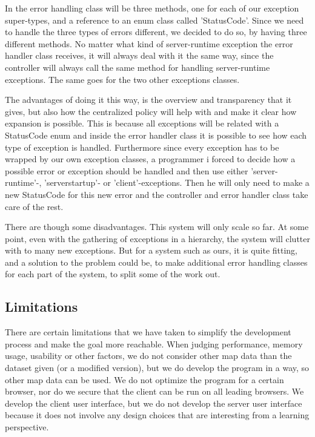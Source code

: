 \documentclass[a4paper,10pt,titlepage]{article}
\begin{document}
 In the error handling class will be three methods, one for each of our exception super-types, and a reference to an enum class called 'StatusCode'. Since we need to handle the three types of errors different, we decided to do so, by having three different methods. No matter what kind of server-runtime exception the error handler class receives, it will always deal with it the same way, since the controller will always call the same method for handling server-runtime exceptions. The same goes for the two other exceptions classes.

The advantages of doing it this way, is the overview and transparency that it gives, but also how the centralized policy will help with and make it clear how expansion is possible. This is because all exceptions will be related with a StatusCode enum and inside the error handler class it is possible to see how each type of exception is handled. Furthermore since every exception has to be wrapped by our own exception classes, a programmer i forced to decide how a possible error or exception should be handled and then use either 'server-runtime'-, 'serverstartup'- or 'client'-exceptions. Then he will only need to make a new StatusCode for this new error and the controller and error handler class take care of the rest.

There are though some disadvantages. This system will only scale so far. At some point, even with the gathering of exceptions in a hierarchy, the system will clutter with to many new exceptions. But for a system such as ours, it is quite fitting, and a solution to the problem could be, to make additional error handling classes for each part of the system, to split some of the work out.

		\newpage
		\subsection{Limitations}\mbox{}
		There are certain limitations that we have taken to simplify the development process and make the goal more reachable. When judging performance, memory usage, usability or other factors, we do not consider other map data than the dataset given (or a modified version), but we do develop the program in a way, so other map data can be used. We do not optimize the program for a certain browser, nor do we secure that the client can be run on all leading browsers. We develop the client user interface, but we do not develop the server user interface because it does not involve any design choices that are interesting from a learning perspective.
				
\end{document}
